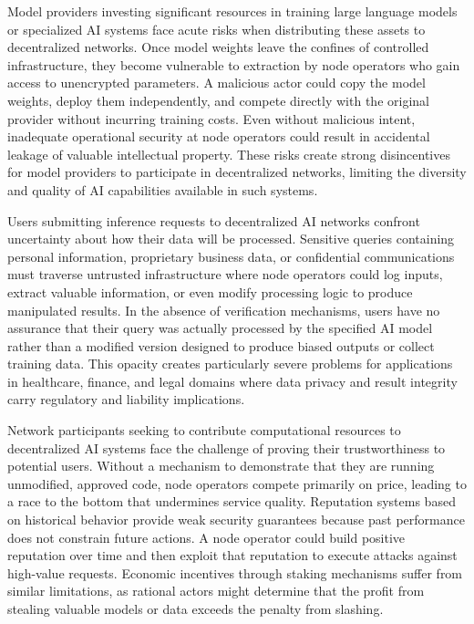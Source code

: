 Model providers investing significant resources in training large language models or specialized AI systems face acute risks when distributing these assets to decentralized networks. Once model weights leave the confines of controlled infrastructure, they become vulnerable to extraction by node operators who gain access to unencrypted parameters. A malicious actor could copy the model weights, deploy them independently, and compete directly with the original provider without incurring training costs. Even without malicious intent, inadequate operational security at node operators could result in accidental leakage of valuable intellectual property. These risks create strong disincentives for model providers to participate in decentralized networks, limiting the diversity and quality of AI capabilities available in such systems.

Users submitting inference requests to decentralized AI networks confront uncertainty about how their data will be processed. Sensitive queries containing personal information, proprietary business data, or confidential communications must traverse untrusted infrastructure where node operators could log inputs, extract valuable information, or even modify processing logic to produce manipulated results. In the absence of verification mechanisms, users have no assurance that their query was actually processed by the specified AI model rather than a modified version designed to produce biased outputs or collect training data. This opacity creates particularly severe problems for applications in healthcare, finance, and legal domains where data privacy and result integrity carry regulatory and liability implications.

Network participants seeking to contribute computational resources to decentralized AI systems face the challenge of proving their trustworthiness to potential users. Without a mechanism to demonstrate that they are running unmodified, approved code, node operators compete primarily on price, leading to a race to the bottom that undermines service quality. Reputation systems based on historical behavior provide weak security guarantees because past performance does not constrain future actions. A node operator could build positive reputation over time and then exploit that reputation to execute attacks against high-value requests. Economic incentives through staking mechanisms suffer from similar limitations, as rational actors might determine that the profit from stealing valuable models or data exceeds the penalty from slashing.

